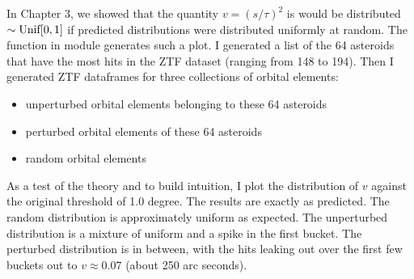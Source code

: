 In Chapter 3, we showed that the quantity $v = (s/\tau)^2$ is would be distributed $\sim \textnormal{Unif}[0,1]$
if predicted distributions were distributed uniformly at random.
The function  in module  generates such a plot.
I generated a list of the 64 asteroids that have the most hits in the ZTF dataset (ranging from 148 to 194).
Then I generated ZTF dataframes for three collections of orbital elements: 
\begin{itemize}
\item unperturbed orbital elements belonging to these 64 asteroids
\item perturbed orbital elements of these 64 asteroids
\item random orbital elements
\end{itemize}
As a test of the theory and to build intuition, I plot the distribution of $v$ against the original threshold of 1.0 degree.
The results are exactly as predicted.
The random distribution is approximately uniform as expected.
The unperturbed distribution is a mixture of uniform and a spike in the first bucket.
The perturbed distribution is in between, with the hits leaking out over the first few buckets out to $v \approx 0.07$ (about 250 arc seconds).
